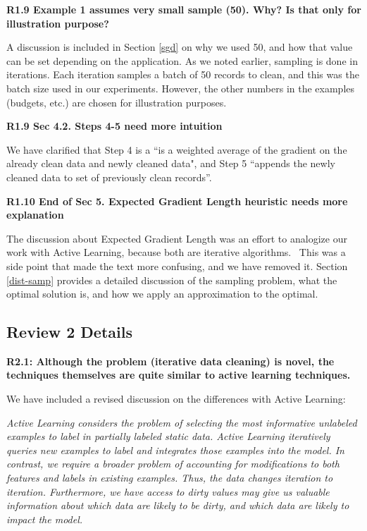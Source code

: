 \vspace{0.5em}

\noindent\textbf{R1.9 Example 1 assumes very small sample (50). Why? Is that only for illustration purpose?}

\noindent  A discussion is included in Section \ref{sgd} on why we used 50, and how that value can be set depending on the application. As we noted earlier, sampling is done in iterations. Each iteration samples a batch of 50 records to clean, and this was the batch size used in our experiments. However, the other numbers in the examples (budgets, etc.) are chosen for illustration purposes. 

\vspace{0.5em}

\noindent\textbf{R1.9 Sec 4.2. Steps 4-5 need more intuition}

\noindent  We have clarified that Step 4 is a ``is a weighted average of the gradient on the already clean data and newly cleaned data", and Step 5 ``appends the newly cleaned data to set of previously clean records''.

\vspace{0.5em}

\noindent\textbf{R1.10 End of Sec 5. Expected Gradient Length heuristic needs more explanation}

\noindent  The discussion about Expected Gradient Length was an effort to analogize our work with Active Learning, because both are iterative algorithms.  This was a side point that made the text more confusing, and we have removed it.
Section \ref{dist-samp} provides a detailed discussion of the sampling problem, what the optimal solution is, and how we apply an approximation to the optimal.

\subsection*{Review 2 Details}

\noindent\textbf{R2.1: Although the problem (iterative data cleaning) is novel, the techniques themselves are quite similar to active learning techniques.}

\noindent  We have included a revised discussion on the differences with Active Learning:

\emph{Active Learning considers the problem of selecting the most informative unlabeled examples to label in partially labeled static data.
Active Learning iteratively queries new examples to label and integrates those examples into the model.
In contrast, we require a broader problem of accounting for modifications to both features and labels in existing examples.
Thus, the data changes iteration to iteration.
Furthermore, we have access to dirty values may give us valuable information about which data are likely to be dirty, and which data are likely to impact the model. }


